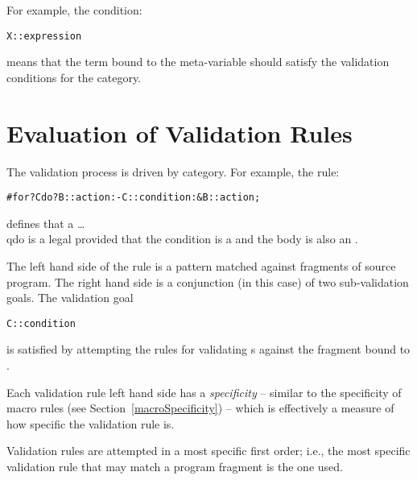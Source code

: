For example, the condition:
\begin{alltt}
X :: expression
\end{alltt}
means that the term bound to the meta-variable  should satisfy the validation conditions for the  category.

\section{Evaluation of Validation Rules}
\label{validationEvaluation}

The validation process is driven by category. For example, the rule:
\begin{alltt}
# for ?C do ?B :: action :- C :: condition :& B :: action;
\end{alltt}
defines that a \ldots\\q{do} is a legal  provided that the condition is a  and the body is also an .

The left hand side of the rule is a pattern matched against fragments of source program. The right hand side is a conjunction (in this case) of two sub-validation goals. The validation goal
\begin{alltt}
C :: condition
\end{alltt}
is satisfied by attempting the rules for validating s against the fragment bound to .

Each validation rule left hand side has a \emph{specificity} -- similar to the specificity of macro rules (see Section~\vref{macroSpecificity}) -- which is effectively a measure of how specific the validation rule is.

Validation rules are attempted in a most specific first order; i.e., the most specific validation rule that may match a program fragment is the one used.


